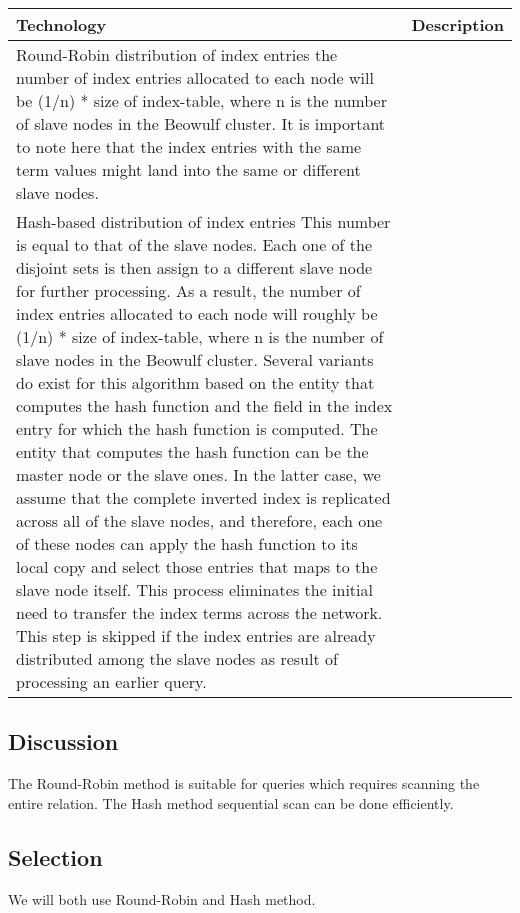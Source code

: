 \begin{center}
    \begin{tabular}{ | l | p{10cm} |} 
    \hline
    Technology & Description    \\ \hline
    Round-Robin distribution of index entries 
    \hline
    the number of index entries allocated to each node will be (1/n) * size of index-table, where n is the number of slave nodes in the      Beowulf cluster. It is important to note here that the index entries with the same term values might land into the same or different slave nodes.   \\ \hline
    Hash-based distribution of index entries
    \hline
    This number is equal to that of the slave nodes. Each one of the disjoint sets is then assign to a different slave node for further processing. As a result, the number of index entries allocated to each node will roughly be (1/n) * size of index-table, where n is the number of slave nodes in the Beowulf cluster. Several variants do exist for this algorithm based on the entity that computes the hash function and the field in the index entry for which the hash function is computed. The entity that computes the hash function can be the master node or the slave ones. In the latter case, we assume that the complete inverted index is replicated across all of the slave nodes, and therefore, each one of these nodes can apply the hash function to its local copy and select those entries that maps to the slave node itself. This process eliminates the initial need to transfer the index terms across the network. This step is skipped if the index entries are already distributed among the slave nodes as result of processing an earlier query. \\ \hline
    \end{tabular}
\end{center}

\subsection{Discussion}

The Round-Robin method is suitable for queries which requires scanning the entire relation. 
The Hash method sequential scan can be done efficiently.

\subsection{Selection}

We will both use Round-Robin and Hash method. 

